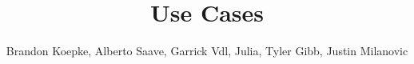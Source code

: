 \title{Use Cases}

\author{Brandon Koepke, Alberto Saave, Garrick Vdl, Julia, Tyler Gibb, Justin Milanovic}

\maketitle
